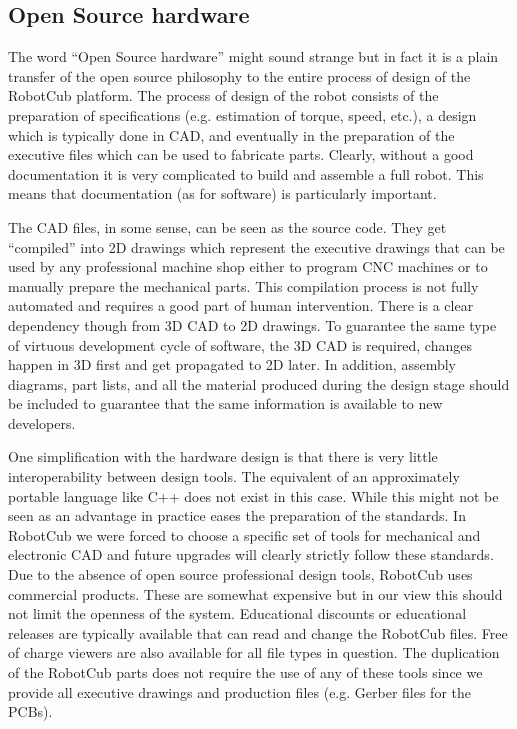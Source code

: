 \subsection{Open Source hardware}
The word ``Open Source hardware'' might sound strange but in fact it is a 
plain transfer of the open source philosophy to the entire process of 
design of the RobotCub platform. The process of design of the robot consists
of the preparation of specifications (e.g. estimation of torque, speed, etc.),
a design which is typically done in CAD, and eventually in the preparation
of the executive files which can be used to fabricate parts. Clearly, without
a good documentation it is very complicated to build and assemble a full robot.
This means that documentation (as for software) is particularly important.

The CAD files, in some sense, can be seen as the source code. They get ``compiled''
into 2D drawings which represent the executive drawings that can be used by any
professional machine shop either to program CNC machines or to manually prepare
the mechanical parts. This compilation process is not fully automated and requires
a good part of human intervention. There is a clear dependency though from 3D CAD
to 2D drawings. To guarantee the same type of virtuous development cycle of 
software, the 3D CAD is required, changes happen in 3D first and get propagated
to 2D later. In addition, assembly diagrams, part lists, and all the material 
produced during the design stage should be included to guarantee that the same
information is available to new developers.

One simplification with the hardware design is that there is very little interoperability
between design tools. The equivalent of an approximately portable language like C++ 
does not exist in this case. While this might not be seen as an advantage in practice
eases the preparation of the standards. In RobotCub we were forced to choose a specific 
set of tools for mechanical and electronic CAD and future upgrades will clearly strictly 
follow these standards. Due to the absence of open source professional design tools, RobotCub
uses commercial products. These are somewhat expensive but in our view this should not limit
the openness of the system. Educational discounts or educational releases are typically 
available that can read and change the RobotCub files. Free of charge viewers are also
available for all file types in question. The duplication of the RobotCub parts does not
require the use of any of these tools since we provide all executive drawings and 
production files (e.g. Gerber files for the PCBs).

